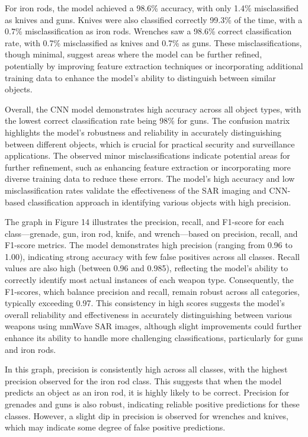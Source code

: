 \documentclass[journal,article,submit,pdftex,moreauthors]{Definitions/mdpi}
\begin{document}
For iron rods, the model achieved a 98.6\% accuracy, with only 1.4\% misclassified as knives and guns. Knives were also classified correctly 99.3\% of the time, with a 0.7\% misclassification as iron rods. Wrenches saw a 98.6\% correct classification rate, with 0.7\% misclassified as knives and 0.7\% as guns. These misclassifications, though minimal, suggest areas where the model can be further refined, potentially by improving feature extraction techniques or incorporating additional training data to enhance the model's ability to distinguish between similar objects.

Overall, the CNN model demonstrates high accuracy across all object types, with the lowest correct classification rate being 98\% for guns. The confusion matrix highlights the model's robustness and reliability in accurately distinguishing between different objects, which is crucial for practical security and surveillance applications. The observed minor misclassifications indicate potential areas for further refinement, such as enhancing feature extraction or incorporating more diverse training data to reduce these errors. The model's high accuracy and low misclassification rates validate the effectiveness of the SAR imaging and CNN-based classification approach in identifying various objects with high precision.


The graph in Figure 14 illustrates the precision, recall, and F1-score for each class—grenade, gun, iron rod, knife, and wrench—based on precision, recall, and F1-score metrics. The model demonstrates high precision (ranging from 0.96 to 1.00), indicating strong accuracy with few false positives across all classes. Recall values are also high (between 0.96 and 0.985), reflecting the model's ability to correctly identify most actual instances of each weapon type. Consequently, the F1-scores, which balance precision and recall, remain robust across all categories, typically exceeding 0.97. This consistency in high scores suggests the model's overall reliability and effectiveness in accurately distinguishing between various weapons using mmWave SAR images, although slight improvements could further enhance its ability to handle more challenging classifications, particularly for guns and iron rods.

In this graph, precision is consistently high across all classes, with the highest precision observed for the iron rod class. This suggests that when the model predicts an object as an iron rod, it is highly likely to be correct. Precision for grenades and guns is also robust, indicating reliable positive predictions for these classes. However, a slight dip in precision is observed for wrenches and knives, which may indicate some degree of false positive predictions.
\end{document}
